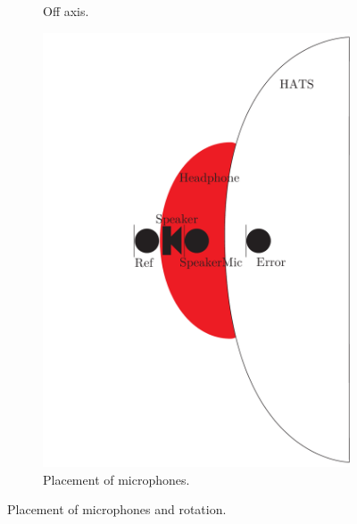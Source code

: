 \begin{figure}[H]
\begin{subfigure}[b]{.4\textwidth}
		\caption{Off axis.}
		\label{fig:AngOfIndOffax}
	\end{subfigure} 
	\begin{subfigure}[b]{.4\textwidth}
	\centering
	\includegraphics[width=\textwidth]{../Journal/Experiments/AngleOfIncidence/AngleOfIncidenceSchematic.pdf}
	\caption{Placement of microphones.}
	\label{fig:AngOgIndMicplace}
\end{subfigure}
	\caption{Placement of microphones and rotation.}
	\label{fig:AngleOfIndDiagram}
\end{figure}


